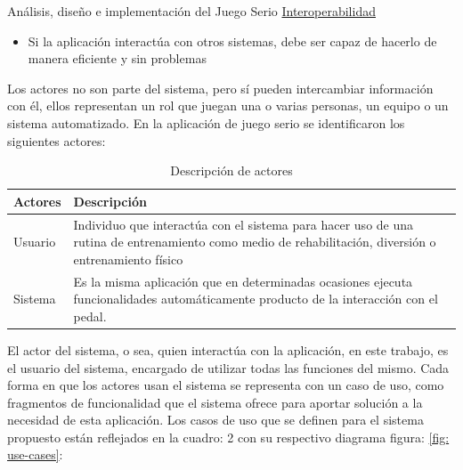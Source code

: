 \begin{thesischapter}{2} {Análisis, diseño e implementación del Juego Serio}
    \underline{Interoperabilidad }
    \begin{itemize}
        \item Si la aplicación interactúa con otros sistemas, debe ser capaz de hacerlo de manera eficiente y sin problemas 
    \end{itemize}

    Los actores no son parte del sistema, pero sí pueden intercambiar información con él, ellos representan un rol que juegan una o varias personas, un equipo o un sistema automatizado. En la aplicación
    de juego serio se identificaron los siguientes actores:

    \begin{table}[ht]
        \centering
        \begin{tabularx}{\textwidth}{|l|X|}
            \hline
            \textbf{Actores} & \textbf{Descripción} \\\hline
            Usuario & Individuo que interactúa con el sistema para hacer uso de una rutina de entrenamiento
            como medio de rehabilitación, diversión o entrenamiento físico \\\hline
            Sistema & Es la misma aplicación que en determinadas ocasiones ejecuta funcionalidades automáticamente producto de la interacción con el pedal. \\\hline
        \end{tabularx}
        \label{tab: actores}
        \caption{Descripción de actores}
    \end{table}


    \vspace{100pt}
    El actor del sistema, o sea, quien interactúa con la aplicación, en este trabajo, es el usuario del sistema, encargado 
    de utilizar todas las funciones del mismo. Cada forma en que los actores usan el sistema se representa con un caso de 
    uso, como fragmentos de funcionalidad que el sistema ofrece para aportar solución a la necesidad de esta aplicación. 
    Los casos de uso que se definen para el sistema propuesto están reflejados en la cuadro: 2 con su respectivo diagrama figura: \ref{fig: use-cases}:
    

\end{thesischapter}
